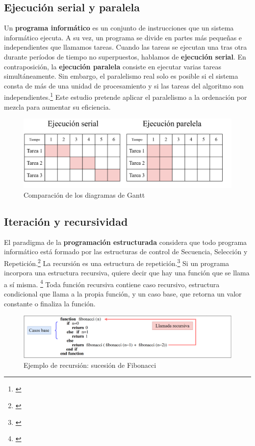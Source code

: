 \documentclass[titlepage]{article}
\begin{document}
\subsection{Ejecución serial y paralela} %
Un \textbf{programa informático} es un conjunto de instrucciones que un sistema informático ejecuta. A su vez, un programa se divide en partes más pequeñas e independientes que llamamos tareas. Cuando las tareas se ejecutan una tras otra durante períodos de tiempo no superpuestos, hablamos de \textbf{ejecución serial}. En contraposición, la \textbf{ejecución paralela} consiste en ejecutar varias tareas simultáneamente. Sin embargo, el paralelismo real solo es posible si el sistema consta de más de una unidad de procesamiento y si las tareas del algoritmo son independientes.\footnote{\cite{bobrov-2023}} Este estudio pretende aplicar el paralelismo a la ordenación por mezcla para aumentar su eficiencia.

\begin{figure}[h]
    \centering
    \captionsetup{justification=centering}
    \includegraphics[width=0.85\linewidth]{Diagrames/serialVsParallel.png}
    \caption{Comparación de los diagramas de Gantt}
    \label{fig:serialVsParallel}
\end{figure}

\subsection{Iteración y recursividad} %
El paradigma de la \textbf{programación estructurada} considera que todo programa informático está formado por las estructuras de control de Secuencia, Selección y Repetición.\footnote{\cite{extended-learning-institute-no-date}} La recursión es una estructura de repetición.\footnote{\cite{wellesley-college-2000}} Si un programa incorpora una estructura recursiva, quiere decir que hay una función que se llama a sí misma. \footnote{\cite{bhargava-2016}} Toda función recursiva contiene caso recursivo, estructura condicional que llama a la propia función, y un caso base,  que retorna un valor constante o finaliza la función.
\begin{figure}[h]
	\includegraphics[width=\textwidth]{ejemploRecursion.png}
	
	\label{fig:ejemploRecursion}
\caption{Ejemplo de recursión: sucesión de Fibonacci}

\end{figure}
\end{document}
